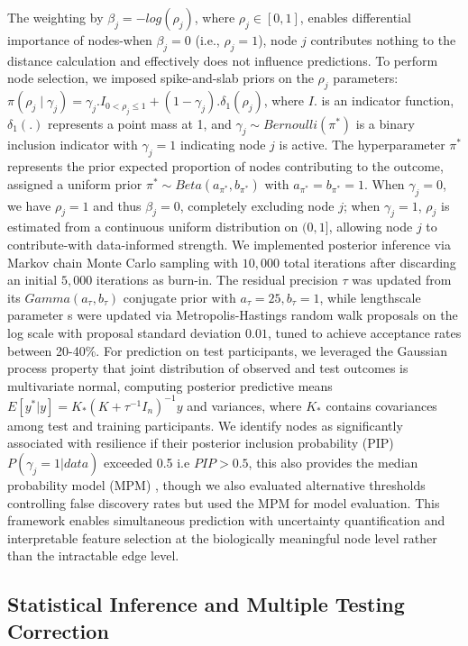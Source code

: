 \documentclass[pdflatex,article,12pt]{article}
\begin{document}
The weighting by $\beta_j = -log(\rho_j)$, where $\rho_j \in[0,1]$, enables differential importance of nodes-when $\beta_j = 0$ (i.e., $\rho_j = 1$), node $j$ contributes nothing to the distance calculation and effectively does not influence predictions. To perform node selection, we imposed spike-and-slab priors on the $\rho_j$ parameters: $\pi(\rho_j\mid \gamma_j) = \gamma_j. I_{0 < \rho_j \leq 1} + (1-\gamma_j).\delta_1(\rho_j)$, where $I{.}$ is an indicator function, $\delta_1(.)$ represents a point mass at 1, and $\gamma_j \sim Bernoulli(\pi^*)$ is a binary inclusion indicator with $\gamma_j = 1$ indicating node $j$ is active. The hyperparameter $\pi^*$ represents the prior expected proportion of nodes contributing to the outcome, assigned a uniform prior $\pi^* \sim Beta(a_{\pi^*}, b_{\pi^*})$ with $a_{\pi^*} = b_{\pi^*} = 1$. When $\gamma_j = 0$, we have $\rho_j = 1$ and thus $\beta_j = 0$, completely excluding node $j$; when $\gamma_j = 1$, $\rho_j$ is estimated from a continuous uniform distribution on $(0,1]$, allowing node $j$ to contribute-with data-informed strength. We implemented posterior inference via Markov chain Monte Carlo sampling with $10,000$ total iterations after discarding an initial $5,000$ iterations as burn-in. The residual precision $\tau$ was updated from its $Gamma(a_{\tau}, b_{\tau})$ conjugate prior with $a_{\tau} = 25, b_{\tau} = 1$, while lengthscale parameter
s were updated via Metropolis-Hastings random walk proposals on the log scale with proposal standard deviation $0.01$, tuned to achieve acceptance rates between 20-40\%. For prediction on test participants, we leveraged the Gaussian process property that joint distribution of observed and test outcomes is multivariate normal, computing posterior predictive means $E[y^*|y] = K_* (K + \tau^{-1}I_n)^{-1} y$ and variances, where $K_*$ contains covariances among test and training participants. We identify nodes as significantly associated with resilience if their posterior inclusion probability (PIP) $P(\gamma_j = 1|data)$ exceeded 0.5 i.e $PIP>0.5$, this also provides the median probability model (MPM) \cite{barbieri2004optimal}, though we also evaluated alternative thresholds controlling false discovery rates but used the MPM for model evaluation. This framework enables simultaneous prediction with uncertainty quantification and interpretable feature selection at the biologically meaningful node level rather than the intractable edge level.

\subsection{Statistical Inference and Multiple Testing Correction}
\end{document}
